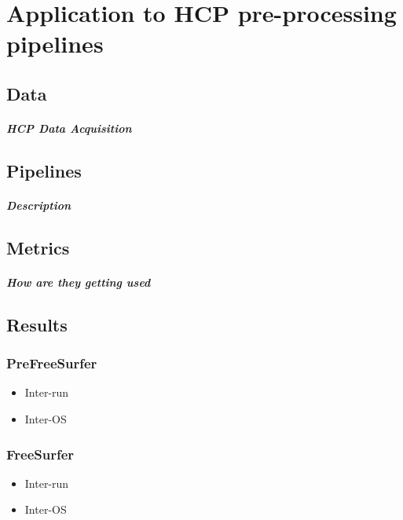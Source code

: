 \chapter{Application to HCP pre-processing pipelines}

\section{Data}
\paragraph{HCP Data Acquisition}

\section{Pipelines}
\paragraph{Description}

\section{Metrics}
\paragraph{How are they getting used}

\section{Results}

\subsection{PreFreeSurfer}
  \begin{itemize}
    \item Inter-run
    \item Inter-OS
  \end{itemize}
  
\subsection{FreeSurfer}
\begin{itemize}
    \item Inter-run
    \item Inter-OS
  \end{itemize}
  
